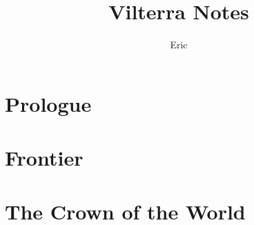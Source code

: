 \documentclass[10pt,twoside,twocolumn,openany,nodeprecatedcode]{dndbook}
\title{Vilterra Notes}
\author{Eric}
\begin{document}
\maketitle

\setcounter{chapter}{-1}
\chapter{Prologue}%
\label{cha:Vilterra}


\chapter{Frontier}%
\label{cha:Frontier}



\chapter{The Crown of the World}%
\label{cha:The Crown of the World}


\end{document}
